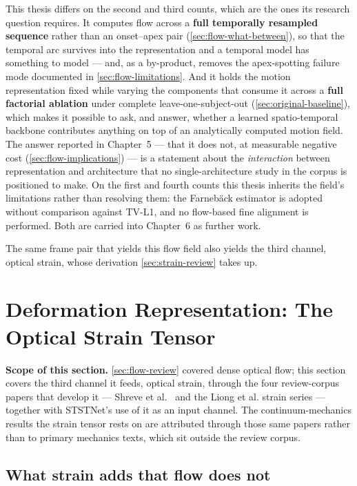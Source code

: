 This thesis differs on the second and third counts, which are the ones its research question requires. It computes flow across a \textbf{full temporally resampled sequence} rather than an onset--apex pair (\autoref{sec:flow-what-between}), so that the temporal arc survives into the representation and a temporal model has something to model --- and, as a by-product, removes the apex-spotting failure mode documented in \autoref{sec:flow-limitations}. And it holds the motion representation fixed while varying the components that consume it across a \textbf{full factorial ablation} under complete leave-one-subject-out (\autoref{sec:original-baseline}), which makes it possible to ask, and answer, whether a learned spatio-temporal backbone contributes anything on top of an analytically computed motion field. The answer reported in Chapter~5 --- that it does not, at measurable negative cost (\autoref{sec:flow-implications}) --- is a statement about the \textit{interaction} between representation and architecture that no single-architecture study in the corpus is positioned to make. On the first and fourth counts this thesis inherits the field's limitations rather than resolving them: the Farneb\"ack estimator is adopted without comparison against TV-L1, and no flow-based fine alignment is performed. Both are carried into Chapter~6 as further work.

The same frame pair that yields this flow field also yields the third channel, optical strain, whose derivation \autoref{sec:strain-review} takes up.


\section{Deformation Representation: The Optical Strain Tensor}
\label{sec:strain-review}

\textbf{Scope of this section.} \autoref{sec:flow-review} covered dense optical flow; this section covers the third channel it feeds, optical strain, through the four review-corpus papers that develop it --- Shreve et al.~\cite{shreve2011} and the Liong et al. strain series --- together with STSTNet's use of it as an input channel. The continuum-mechanics results the strain tensor rests on are attributed through those same papers rather than to primary mechanics texts, which sit outside the review corpus.

\subsection{What strain adds that flow does not}
\label{sec:strain-what-adds}

